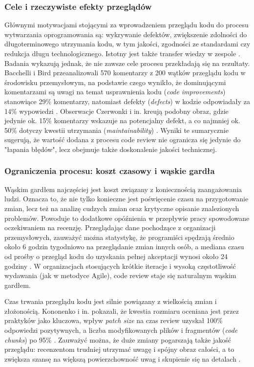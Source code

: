 \subsubsection*{Cele i rzeczywiste efekty przeglądów}
Głównymi motywacjami stojącymi za wprowadzeniem przeglądu kodu do procesu wytwarzania oprogramowania są: wykrywanie defektów,
zwiększenie zdolności do długoterminowego utrzymania kodu, w tym jakości, zgodności ze standardami czy redukcja długu
technologicznego. Istotny jest także transfer wiedzy w zespole \cite{bacchelli2013, kononenko2016}.
Badania wykazują jednak, że nie zawsze cele procesu przekładają się na rezultaty.
Bacchelli i Bird przeanalizowali 570 komentarzy z 200 wątków przeglądu kodu w środowisku przemysłowym, na podstawie czego
wynikło, że dominującymi komentarzami są uwagi na temat usprawnienia kodu (\emph{code improvements}) stanowiące 29\% 
komentarzy, natomiast defekty (\emph{defects}) w kodzie odpowiadały za 14\% wypowiedzi \cite{bacchelli2013}.
Obserwacje Czerwonki i in. kreują podobny obraz, gdzie jedynie ok. 15\% komentarzy wskazuje na potencjalny defekt,
a co najmniej ok. 50\% dotyczy kwestii utrzymania (\emph{maintainability}) \cite{czerwonka2015}.
Wyniki te sumarycznie sugerują, że wartość dodana z procesu code review nie ogranicza się jedynie do "łapania błędów",
lecz obejmuje także doskonalenie jakości technicznej.

\subsubsection*{Ograniczenia procesu: koszt czasowy i wąskie gardła}
Wąskim gardłem najczęściej jest koszt związany z koniecznością zaangażowania ludzi.
Oznacza to, że nie tylko konieczne jest poświęcenie czasu na przygotowanie zmian, lecz też na analizę cudzych zmian oraz
krytyczne opisanie znalezionych problemów. Powoduje to dodatkowe opóźnienia w przepływie pracy spowodowane oczekiwaniem na recenzję.
Przeglądając dane pochodzące z organizacji przemysłowych, zauważyć można statystykę, że programiści spędzają średnio około
6 godzin tygodniowo na przeglądanie zmian innych osób, a mediana czasu od prośby o przegląd kodu do uzyskania pełnej akceptacji
wynosi około 24 godziny \cite{czerwonka2015}.
W organizacjach stosujących krótkie iteracje i wysoką częstotliwość wydawania (jak w metodyce Agile), code review staje się
naturalnym wąskim gardłem.

Czas trwania przeglądu kodu jest silnie powiązany z wielkością zmian i złożonością.
Kononenko i in. pokazali, że kwestia rozmiaru oceniana jest przez praktyków jako kluczowa, wpływ \emph{patch size} na czas
review uzyskał 100\% odpowiedzi pozytywnych, a liczba modyfikowanych plików i fragmentów (\emph{code chunks}) po 95\% \cite{kononenko2016}.
Zauważyć można, że duże zmiany pogarszają także jakość przeglądu: recenzentom trudniej utrzymać uwagę i spójny
obraz całości, a to zwiększa szansę na większą powierzchowność uwag i skupienie się na detalach \cite{kononenko2016}.

